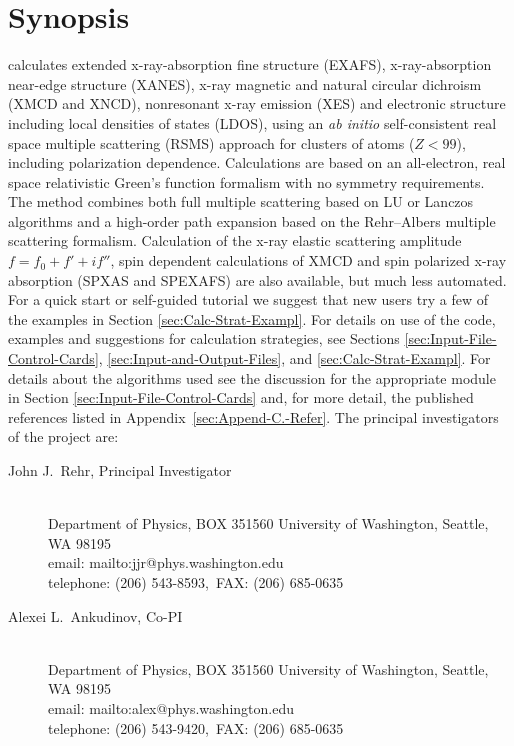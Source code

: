 \documentclass[11pt,oneside]{report} %
\begin{document}
\newchapter{}
\tableofcontents
\newchapter{}

\setcounter{page}{1}

\chapter{Synopsis} %
\label{sec:Synopsis}

{\feffcur} calculates extended x-ray-absorption fine structure
(EXAFS), x-ray-absorption near-edge structure (XANES), x-ray
magnetic and natural circular dichroism (XMCD and XNCD),
 nonresonant x-ray emission (XES) and electronic structure including local
densities of states (LDOS), using an \textit{ab initio} self-consistent
real space multiple scattering (RSMS) approach for clusters of atoms
($Z < 99$), including polarization dependence.  Calculations are based
on an all-electron, real space relativistic Green's function formalism
with no symmetry requirements. The method combines both full multiple
scattering based on LU or Lanczos algorithms and a high-order path
expansion based on the Rehr--Albers multiple scattering formalism.
Calculation of the x-ray elastic scattering amplitude $f=f_0+f'+if''$,
spin dependent calculations of XMCD and 
spin polarized x-ray absorption (SPXAS and SPEXAFS) are also
available, but much less automated.
For a quick start or self-guided tutorial
we suggest that new users try a few of the examples in Section
\ref{sec:Calc-Strat-Exampl}.  For details on use of the code, examples
and suggestions for calculation strategies, see Sections
\ref{sec:Input-File-Control-Cards}, \ref{sec:Input-and-Output-Files}, and
\ref{sec:Calc-Strat-Exampl}.  For details about the algorithms used
see the discussion for the appropriate module in Section
\ref{sec:Input-File-Control-Cards} and, for more detail, the published
references listed in Appendix~\ref{sec:Append-C.-Refer}.
The principal investigators of the {\feff} project are:
\begin{description}
\item[John J.~Rehr, Principal Investigator]\hfill\\
Department of Physics, BOX 351560 University of Washington, Seattle, WA 98195\\
email: 
{mailto:jjr@phys.washington.edu}\\
telephone: (206) 543-8593,\  FAX: (206) 685-0635
\item[Alexei L.~Ankudinov, Co-PI]\hfill\\
Department of Physics, BOX 351560 University of Washington, Seattle, WA 98195\\
email: 
{mailto:alex@phys.washington.edu}\\
telephone: (206) 543-9420,\ FAX: (206) 685-0635
\end{description}
\end{document}
